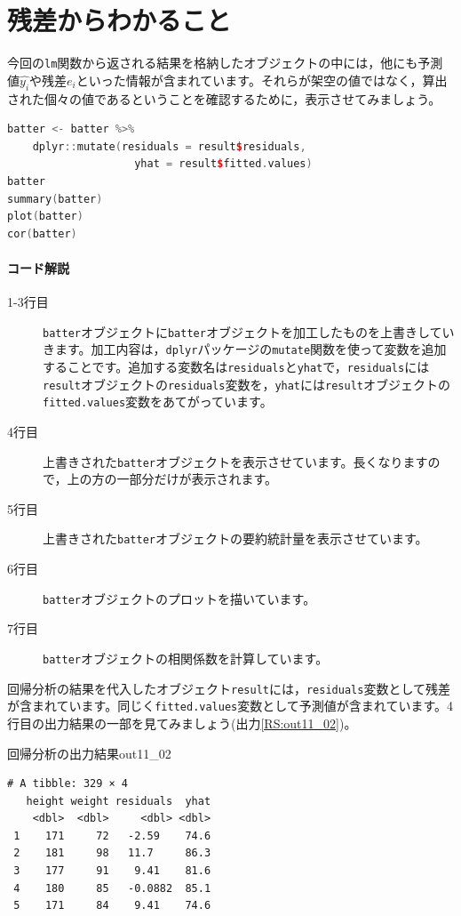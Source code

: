 \documentclass{ltjbook}
\begin{document}
\section{残差からわかること}
今回の\texttt{lm}関数から返される結果を格納したオブジェクトの中には，他にも予測値$\hat{y_i}$や残差$e_i$といった情報が含まれています。それらが架空の値ではなく，算出された個々の値であるということを確認するために，表示させてみましょう。

\begin{lstlisting}[language=c++,label={code:11_05},caption={回帰分析のその他の情報}]
batter <- batter %>% 
    dplyr::mutate(residuals = result$residuals,
                    yhat = result$fitted.values) 
batter
summary(batter)
plot(batter)
cor(batter)
\end{lstlisting}

\paragraph{コード解説}
\begin{description}
	\item[1-3行目] \verb|batter|オブジェクトに\verb|batter|オブジェクトを加工したものを上書きしていきます。加工内容は，\verb|dplyr|パッケージの\verb|mutate|関数を使って変数を追加することです。追加する変数名は\verb|residuals|と\verb|yhat|で，\verb|residuals|には\verb|result|オブジェクトの\verb|residuals|変数を，\verb|yhat|には\verb|result|オブジェクトの\verb|fitted.values|変数をあてがっています。
	\item[4行目] 上書きされた\verb|batter|オブジェクトを表示させています。長くなりますので，上の方の一部分だけが表示されます。
	\item[5行目] 上書きされた\verb|batter|オブジェクトの要約統計量を表示させています。
	\item[6行目] \verb|batter|オブジェクトのプロットを描いています。
	\item[7行目] \verb|batter|オブジェクトの相関係数を計算しています。
\end{description}

回帰分析の結果を代入したオブジェクト\verb|result|には，\verb|residuals|変数として残差が含まれています。同じく\verb|fitted.values|変数として予測値が含まれています。4行目の出力結果の一部を見てみましょう(出力\ref{RS:out11_02})。
\begin{Rscreen}{回帰分析の出力結果}{out11_02}
	\begin{verbatim}
# A tibble: 329 × 4
   height weight residuals  yhat
    <dbl>  <dbl>     <dbl> <dbl>
 1    171     72   -2.59    74.6
 2    181     98   11.7     86.3
 3    177     91    9.41    81.6
 4    180     85   -0.0882  85.1
 5    171     84    9.41    74.6
\end{verbatim}
\end{Rscreen}
\end{document}
